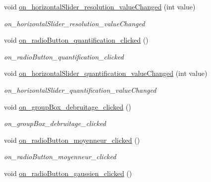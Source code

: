 \begin{DoxyCompactItemize}
void \hyperlink{classMainWindow_a4494766914e41c3351f7c1e690968154}{on\+\_\+horizontal\+Slider\+\_\+resolution\+\_\+value\+Changed} (int value)
\begin{DoxyCompactList}\small\item\em on\+\_\+horizontal\+Slider\+\_\+resolution\+\_\+value\+Changed \end{DoxyCompactList}\item 
\mbox{\label{classMainWindow_a8cd0cb42f3c2938fed72485017821bd1}} 
void \hyperlink{classMainWindow_a8cd0cb42f3c2938fed72485017821bd1}{on\+\_\+radio\+Button\+\_\+quantification\+\_\+clicked} ()
\begin{DoxyCompactList}\small\item\em on\+\_\+radio\+Button\+\_\+quantification\+\_\+clicked \end{DoxyCompactList}\item 
void \hyperlink{classMainWindow_a99e8722ec23f19c1d8bda4d38e06435c}{on\+\_\+horizontal\+Slider\+\_\+quantification\+\_\+value\+Changed} (int value)
\begin{DoxyCompactList}\small\item\em on\+\_\+horizontal\+Slider\+\_\+quantification\+\_\+value\+Changed \end{DoxyCompactList}\item 
\mbox{\label{classMainWindow_a841611a6fb40370ae0d321e479e761eb}} 
void \hyperlink{classMainWindow_a841611a6fb40370ae0d321e479e761eb}{on\+\_\+group\+Box\+\_\+debruitage\+\_\+clicked} ()
\begin{DoxyCompactList}\small\item\em on\+\_\+group\+Box\+\_\+debruitage\+\_\+clicked \end{DoxyCompactList}\item 
\mbox{\label{classMainWindow_aad60cb1c0c65e4bcd627c82b79c60841}} 
void \hyperlink{classMainWindow_aad60cb1c0c65e4bcd627c82b79c60841}{on\+\_\+radio\+Button\+\_\+moyenneur\+\_\+clicked} ()
\begin{DoxyCompactList}\small\item\em on\+\_\+radio\+Button\+\_\+moyenneur\+\_\+clicked \end{DoxyCompactList}\item 
\mbox{\label{classMainWindow_a73757dee3a85b6fe6c81bb543c8c15e9}} 
void \hyperlink{classMainWindow_a73757dee3a85b6fe6c81bb543c8c15e9}{on\+\_\+radio\+Button\+\_\+gaussien\+\_\+clicked} ()

\end{DoxyCompactItemize}
